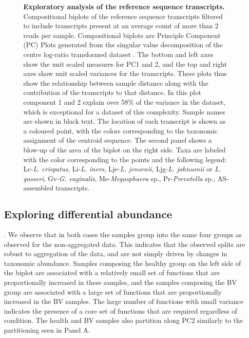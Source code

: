 \documentclass[10pt,letterpaper]{article}
\begin{document}
\begin{figure}[h]
\caption{{\bf Exploratory analysis of the reference sequence transcripts.}
Compositional biplots of the reference sequence transcripts filtered to include transcripts present at an average count of more than 2 reads per sample. Compositional biplots are Principle Component (PC) Plots generated from the singular value decomposition of the centre log-ratio transformed dataset \cite{aitchison2002biplots}. The bottom and left axes show the unit scaled measures for PC1 and 2, and the top and right axes show unit scaled variances for the transcripts. These plots thus show the relationship between sample distance along with the contribution of the transcripts to that distance. In this plot component 1 and 2 explain over 58\% of the variance in the dataset, which is exceptional for a dataset of this complexity. Sample names are shown in black text. The location of each transcript is shown as a coloured point, with the colors corresponding to the taxonomic assignment of the centroid sequence. The second panel shows a blow-up of the area of the biplot on the right side. Taxa are labeled with the  color corresponding to the points and the following legend: Lc-\emph{L. crispatus},  Li-\emph{L. iners},  Lje-\emph{L. jensenii}, Ljg-\emph{L. johnsonii} or \emph{L. gasseri}, Gv-\emph{G. vaginalis}, Me-\emph{Megasphaera} sp., Pr-\emph{Prevotella} sp., AS- assembled transcripts. }
\label{F1:refseq_biplot}
\end{figure}

\subsection{Exploring differential abundance}


. We observe that in both cases the  samples group into the same four groups as observed for the non-aggregated data. This indicates that the observed splits are robust to aggregation of the data, and are not simply driven by changes in taxonomic abundance. Samples composing the healthy group on the left side of the biplot are associated with a relatively small set of functions that are proportionally increased in these samples, and the samples composing the BV group are associated with a large set of functions that are proportionally increased in the BV samples.  The large number of functions with small variance indicates the presence of a core set of functions that are required regardless of condition. The health and BV samples also partition along PC2 similarly to the partitioning seen in Panel A. 
\end{document}
